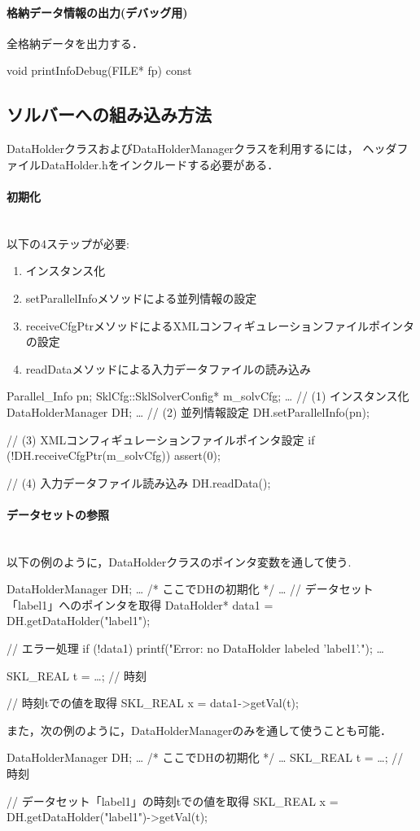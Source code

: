 \paragraph{格納データ情報の出力(デバッグ用)}
全格納データを出力する．
{\small
\begin{program}
void printInfoDebug(FILE* fp) const
\end{program}
}



\subsection{ソルバーへの組み込み方法}
DataHolderクラスおよびDataHolderManagerクラスを利用するには，
ヘッダファイルDataHolder.hをインクルードする必要がある．

\paragraph{初期化}\mbox{}\\
以下の4ステップが必要:
\begin{enumerate}
\item インスタンス化
\item setParallelInfoメソッドによる並列情報の設定
\item receiveCfgPtrメソッドによるXMLコンフィギュレーションファイルポインタの設定
\item readDataメソッドによる入力データファイルの読み込み
\end{enumerate}
\begin{program}
  Parallel_Info pn;
  SklCfg::SklSolverConfig* m_solvCfg;
  …
  // (1) インスタンス化
  DataHolderManager DH;   
  …
  // (2) 並列情報設定
  DH.setParallelInfo(pn);

  // (3) XMLコンフィギュレーションファイルポインタ設定
  if (!DH.receiveCfgPtr(m_solvCfg)) assert(0);

  // (4) 入力データファイル読み込み
  DH.readData();
\end{program}

\paragraph{データセットの参照}\mbox{}\\
以下の例のように，DataHolderクラスのポインタ変数を通して使う.
\begin{program}
  DataHolderManager DH;
  …
  /* ここでDHの初期化 */
  …
  // データセット「label1」へのポインタを取得
  DataHolder* data1 = DH.getDataHolder("label1");

  // エラー処理
  if (!data1) {
    printf("Error: no DataHolder labeled 'label1'.\n");
    …
  }

  SKL_REAL t = …;  // 時刻

  // 時刻tでの値を取得
  SKL_REAL x = data1->getVal(t);
\end{program}

また，次の例のように，DataHolderManagerのみを通して使うことも可能．
{\small
\begin{program}
  DataHolderManager DH;
  …
  /* ここでDHの初期化 */
  …
  SKL_REAL t = …;  // 時刻

  // データセット「label1」の時刻tでの値を取得
  SKL_REAL x = DH.getDataHolder("label1")->getVal(t);
\end{program}
}
